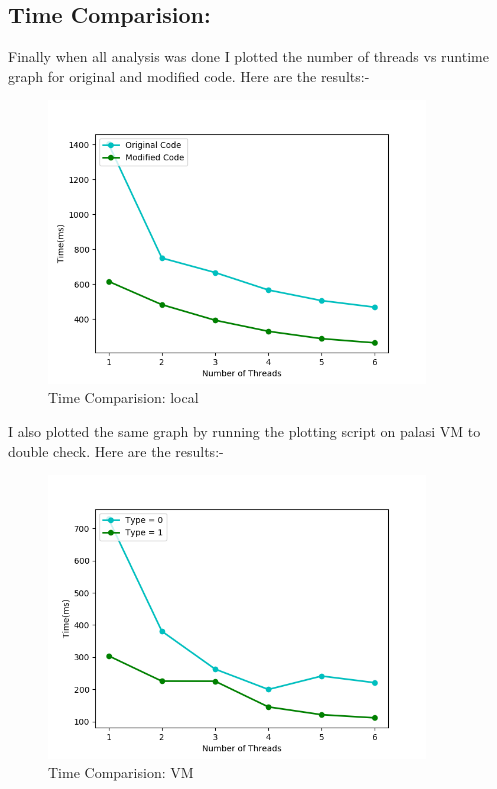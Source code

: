 \documentclass{article}
\begin{document}
\subsection{Time Comparision: }
Finally when all analysis was done I plotted the number of threads vs runtime graph for original and modified code. Here are the results:- \\
\begin{figure}[H]
    \centering
    \includegraphics[width=10cm]{time-analysis.png}
    \caption{Time Comparision: local}
\end{figure}

I also plotted the same graph by running the plotting script on palasi VM to double check. Here are the results:- 
\begin{figure}[H]
    \centering
    \includegraphics[width=10cm]{time-analysis-vm.png}
    \caption{Time Comparision: VM}
\end{figure}
\end{document}
